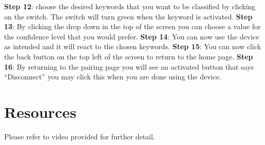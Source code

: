 \documentclass{article}
\begin{document}
\newline
\textbf{Step 12}: choose the desired keywords that you want to be classified by clicking on the switch. The switch will turn green when the keyword is activated.
\newline
\textbf{Step 13}: By clicking the drop down in the top of the screen you can choose a value for the confidence level that you would prefer. 
\newline
\textbf{Step 14}: You can now use the device as intended and it will react to the chosen keywords.
\newline
\textbf{Step 15}: You can now click the back button on the top left of the screen to return to the home page.
\newline
\textbf{Step 16}: By returning to the pairing page you will see an activated button that says “Disconnect” you may click this when you are done using the device.
\newline

\section{Resources}
Please refer to video provided for further detail. 
\end{document}
